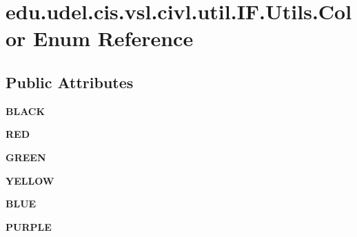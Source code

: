 \hypertarget{enumedu_1_1udel_1_1cis_1_1vsl_1_1civl_1_1util_1_1IF_1_1Utils_1_1Color}{}\section{edu.\+udel.\+cis.\+vsl.\+civl.\+util.\+I\+F.\+Utils.\+Color Enum Reference}
\label{enumedu_1_1udel_1_1cis_1_1vsl_1_1civl_1_1util_1_1IF_1_1Utils_1_1Color}
\subsection*{Public Attributes}
\begin{DoxyCompactItemize}
\item 
\hypertarget{enumedu_1_1udel_1_1cis_1_1vsl_1_1civl_1_1util_1_1IF_1_1Utils_1_1Color_ab3f19aef6c93a7b05390f8cd6a61763b}{}{\bfseries B\+L\+A\+C\+K}\label{enumedu_1_1udel_1_1cis_1_1vsl_1_1civl_1_1util_1_1IF_1_1Utils_1_1Color_ab3f19aef6c93a7b05390f8cd6a61763b}

\item 
\hypertarget{enumedu_1_1udel_1_1cis_1_1vsl_1_1civl_1_1util_1_1IF_1_1Utils_1_1Color_a1d2ee7eedb13e5cb9b8e99292730134b}{}{\bfseries R\+E\+D}\label{enumedu_1_1udel_1_1cis_1_1vsl_1_1civl_1_1util_1_1IF_1_1Utils_1_1Color_a1d2ee7eedb13e5cb9b8e99292730134b}

\item 
\hypertarget{enumedu_1_1udel_1_1cis_1_1vsl_1_1civl_1_1util_1_1IF_1_1Utils_1_1Color_a0de7985630a6904fd840e5d183700384}{}{\bfseries G\+R\+E\+E\+N}\label{enumedu_1_1udel_1_1cis_1_1vsl_1_1civl_1_1util_1_1IF_1_1Utils_1_1Color_a0de7985630a6904fd840e5d183700384}

\item 
\hypertarget{enumedu_1_1udel_1_1cis_1_1vsl_1_1civl_1_1util_1_1IF_1_1Utils_1_1Color_ad48bd86e1377ca26b06ec08dc466e298}{}{\bfseries Y\+E\+L\+L\+O\+W}\label{enumedu_1_1udel_1_1cis_1_1vsl_1_1civl_1_1util_1_1IF_1_1Utils_1_1Color_ad48bd86e1377ca26b06ec08dc466e298}

\item 
\hypertarget{enumedu_1_1udel_1_1cis_1_1vsl_1_1civl_1_1util_1_1IF_1_1Utils_1_1Color_aac659243722d8bfbf17671776b1a06e8}{}{\bfseries B\+L\+U\+E}\label{enumedu_1_1udel_1_1cis_1_1vsl_1_1civl_1_1util_1_1IF_1_1Utils_1_1Color_aac659243722d8bfbf17671776b1a06e8}

\item 
\hypertarget{enumedu_1_1udel_1_1cis_1_1vsl_1_1civl_1_1util_1_1IF_1_1Utils_1_1Color_a8a31c62c45543105f6e44998b4c53b2c}{}{\bfseries P\+U\+R\+P\+L\+E}\label{enumedu_1_1udel_1_1cis_1_1vsl_1_1civl_1_1util_1_1IF_1_1Utils_1_1Color_a8a31c62c45543105f6e44998b4c53b2c}


\end{DoxyCompactItemize}
